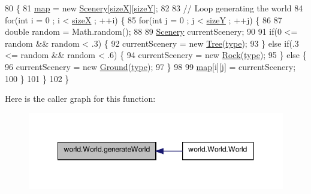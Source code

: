 \begin{DoxyCode}
80                                    \{
81         \hyperlink{classworld_1_1_world_ab586ab2ff7a28c66e492722dd30a2d5a}{map} = \textcolor{keyword}{new} \hyperlink{classworld_1_1scenery_1_1_scenery}{Scenery}[\hyperlink{classworld_1_1_world_ab2ca92c9d2a56f6fa1872dc6cf0f4ab3}{sizeX}][\hyperlink{classworld_1_1_world_a3a110ad1276dc7dfa6bc47d9a663ec5e}{sizeY}];
82 
83         \textcolor{comment}{// Loop generating the world}
84         \textcolor{keywordflow}{for}(\textcolor{keywordtype}{int} i = 0 ; i < \hyperlink{classworld_1_1_world_ab2ca92c9d2a56f6fa1872dc6cf0f4ab3}{sizeX} ; ++i) \{
85             \textcolor{keywordflow}{for}(\textcolor{keywordtype}{int} j = 0 ; j < \hyperlink{classworld_1_1_world_a3a110ad1276dc7dfa6bc47d9a663ec5e}{sizeY} ; ++j) \{
86 
87                 \textcolor{keywordtype}{double} random = Math.random();
88 
89                 \hyperlink{classworld_1_1scenery_1_1_scenery}{Scenery} currentScenery;
90 
91                 \textcolor{keywordflow}{if}(0 <= random && random < .3) \{
92                     currentScenery = \textcolor{keyword}{new} \hyperlink{classworld_1_1scenery_1_1_tree}{Tree}(\hyperlink{classworld_1_1_world_a008564127f7e69c09224a84ca7081893}{type});
93                 \} \textcolor{keywordflow}{else} \textcolor{keywordflow}{if}(.3 <= random && random < .6) \{
94                     currentScenery = \textcolor{keyword}{new} \hyperlink{classworld_1_1scenery_1_1_rock}{Rock}(\hyperlink{classworld_1_1_world_a008564127f7e69c09224a84ca7081893}{type});
95                 \} \textcolor{keywordflow}{else} \{
96                     currentScenery = \textcolor{keyword}{new} \hyperlink{classworld_1_1scenery_1_1_ground}{Ground}(\hyperlink{classworld_1_1_world_a008564127f7e69c09224a84ca7081893}{type});
97                 \}
98 
99                 \hyperlink{classworld_1_1_world_ab586ab2ff7a28c66e492722dd30a2d5a}{map}[i][j] = currentScenery;
100             \}
101         \}
102     \}
\end{DoxyCode}


Here is the caller graph for this function\-:\nopagebreak
\begin{figure}[H]
\begin{center}
\leavevmode
\includegraphics[width=348pt]{classworld_1_1_world_aad82a66d1f2f8a7c8afa0483692754e8_icgraph}
\end{center}
\end{figure}


